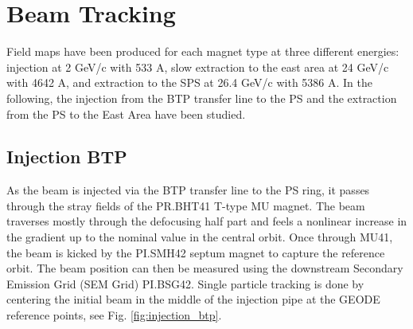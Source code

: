 \documentclass[a4paper,
               biblatex,     %
               keeplastbox,   %
               ]{jacow}
\begin{document}
\section{Beam Tracking}
Field maps have been produced for each magnet type at three different energies: injection at 2 GeV/c with 533 A, slow extraction to the east area at 24 GeV/c with 4642 A, and extraction to the SPS at 26.4 GeV/c with 5386 A. In the following, the injection from the BTP transfer line to the PS and the extraction from the PS to the East Area have been studied.

\subsection{Injection BTP}
As the beam is injected via the BTP transfer line to the PS ring, it passes through the stray fields of the PR.BHT41 T-type MU magnet. The beam traverses mostly through the defocusing half part and feels a nonlinear increase in the gradient up to the nominal value in the central orbit. Once through MU41, the beam is kicked by the PI.SMH42 septum magnet to capture the reference orbit. The beam position can then be measured using the downstream Secondary Emission Grid (SEM Grid) PI.BSG42. Single particle tracking is done by centering the initial beam in the middle of the injection pipe at the GEODE reference points, see Fig. \ref{fig:injection_btp}.
\end{document}
